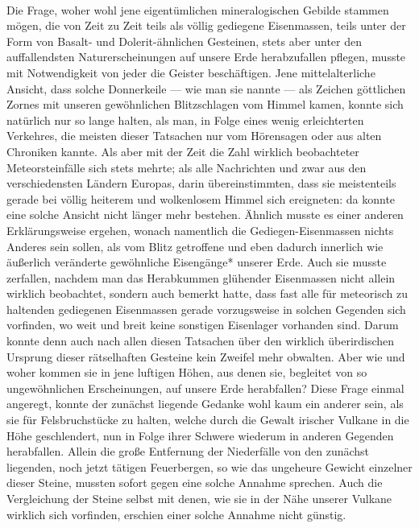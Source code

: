 \documentclass[a4paper, 11pt, oneside, polutonikogreek, german]{article}
\begin{document}
\paragraph{}
Die Frage, woher wohl jene eigentümlichen mineralogischen Gebilde stammen mögen, die von Zeit zu Zeit teils als völlig gediegene Eisenmassen, teils unter der Form von Basalt- und Dolerit-ähnlichen Gesteinen, stets aber unter den auffallendsten Naturerscheinungen auf unsere Erde herabzufallen pflegen, musste mit Notwendigkeit von jeder die Geister beschäftigen. Jene mittelalterliche Ansicht, dass solche Donnerkeile — wie man sie nannte — als Zeichen göttlichen Zornes mit unseren gewöhnlichen Blitzschlagen vom Himmel kamen, konnte sich natürlich nur so lange halten, als man, in Folge eines wenig erleichterten Verkehres, die meisten dieser Tatsachen nur vom Hörensagen oder aus alten Chroniken kannte. Als aber mit der Zeit die Zahl wirklich beobachteter Meteorsteinfälle sich stets mehrte; als alle Nachrichten und zwar aus den verschiedensten Ländern Europas, darin übereinstimmten, dass sie meistenteils gerade bei völlig heiterem und wolkenlosem Himmel sich ereigneten: da konnte eine solche Ansicht nicht länger mehr bestehen. Ähnlich musste es einer anderen Erklärungsweise ergehen, wonach namentlich die Gediegen-Eisenmassen nichts Anderes sein sollen, als vom Blitz getroffene und eben dadurch innerlich wie äußerlich veränderte gewöhnliche Eisengänge* unserer Erde. Auch sie musste zerfallen, nachdem man das Herabkummen glühender Eisenmassen nicht allein wirklich beobachtet, sondern auch bemerkt hatte, dass fast alle für meteorisch zu haltenden gediegenen Eisenmassen gerade vorzugsweise in solchen Gegenden sich vorfinden, wo weit und breit keine sonstigen Eisenlager vorhanden sind. Darum konnte denn auch nach allen diesen Tatsachen über den wirklich überirdischen Ursprung dieser rätselhaften Gesteine kein Zweifel mehr obwalten. Aber wie und woher kommen sie in jene luftigen Höhen, aus denen sie, begleitet von so ungewöhnlichen Erscheinungen, auf unsere Erde herabfallen? Diese Frage einmal angeregt, konnte der zunächst liegende Gedanke wohl kaum ein anderer sein, als sie für Felsbruchstücke zu halten, welche durch die Gewalt irischer Vulkane in die Höhe geschlendert, nun in Folge ihrer Schwere wiederum in anderen Gegenden herabfallen. Allein die große Entfernung der Niederfälle von den zunächst liegenden, noch jetzt tätigen Feuerbergen, so wie das ungeheure Gewicht einzelner dieser Steine, mussten sofort gegen eine solche Annahme sprechen. Auch die Vergleichung der Steine selbst mit denen, wie sie in der Nähe unserer Vulkane wirklich sich vorfinden, erschien einer solche Annahme nicht günstig.
\end{document}
